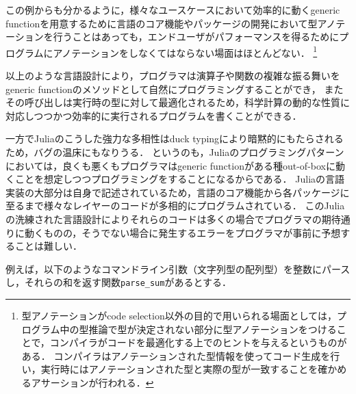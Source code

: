 この例からも分かるように，様々なユースケースにおいて効率的に動くgeneric functionを用意するために言語のコア機能やパッケージの開発において型アノテーションを行うことはあっても，エンドユーザがパフォーマンスを得るためにプログラムにアノテーションをしなくてはならない場面はほとんどない．
\footnote{
  型アノテーションがcode selection以外の目的で用いられる場面としては，プログラム中の型推論で型が決定されない部分に型アノテーションをつけることで，コンパイラがコードを最適化する上でのヒントを与えるというものがある\cite{type-annotation}．
  コンパイラはアノテーションされた型情報を使ってコード生成を行い，実行時にはアノテーションされた型と実際の型が一致することを確かめるアサーションが行われる．
}

以上のような言語設計により，プログラマは演算子や関数の複雑な振る舞いをgeneric functionのメソッドとして自然にプログラミングすることができ\footnotemark，
またその呼び出しは実行時の型に対して最適化されるため，科学計算の動的な性質に対応しつつかつ効率的に実行されるプログラムを書くことができる．


\vspace{1ex}

一方でJuliaのこうした強力な多相性はduck typingにより暗黙的にもたらされるため，バグの温床にもなりうる．
というのも，Juliaのプログラミングパターンにおいては，良くも悪くもプログラマはgeneric functionがある種out-of-boxに動くことを想定しつつプログラミングをすることになるからである．
Juliaの言語実装の大部分は自身で記述されているため，言語のコア機能から各パッケージに至るまで様々なレイヤーのコードが多相的にプログラムされている．
このJuliaの洗練された言語設計によりそれらのコードは多くの場合でプログラマの期待通りに動くものの，そうでない場合に発生するエラーをプログラマが事前に予想することは難しい．

例えば，以下のようなコマンドライン引数（文字列型の配列型）を整数にパースし，それらの和を返す関数\verb|parse_sum|があるとする．

